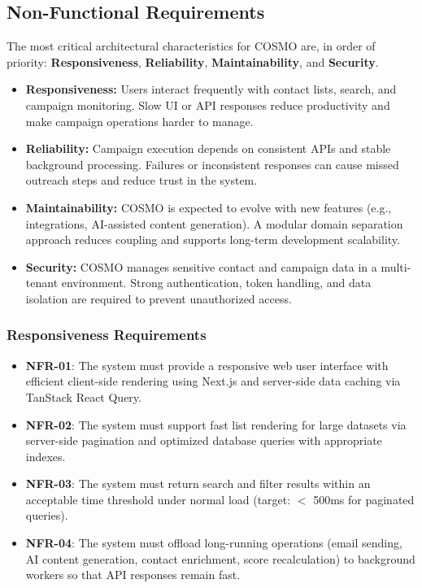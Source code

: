 
\subsection{Non-Functional Requirements}

The most critical architectural characteristics for COSMO are, in order of priority: \textbf{Responsiveness}, \textbf{Reliability}, \textbf{Maintainability}, and \textbf{Security}.

\begin{itemize}
    \item \textbf{Responsiveness:} Users interact frequently with contact lists, search, and campaign monitoring. Slow UI or API responses reduce productivity and make campaign operations harder to manage.
    \item \textbf{Reliability:} Campaign execution depends on consistent APIs and stable background processing. Failures or inconsistent responses can cause missed outreach steps and reduce trust in the system.
    \item \textbf{Maintainability:} COSMO is expected to evolve with new features (e.g., integrations, AI-assisted content generation). A modular domain separation approach reduces coupling and supports long-term development scalability.
    \item \textbf{Security:} COSMO manages sensitive contact and campaign data in a multi-tenant environment. Strong authentication, token handling, and data isolation are required to prevent unauthorized access.
\end{itemize}

\subsubsection{Responsiveness Requirements}
\begin{itemize}
    \item \textbf{NFR-01}: The system must provide a responsive web user interface with efficient client-side rendering using Next.js and server-side data caching via TanStack React Query.
    \item \textbf{NFR-02}: The system must support fast list rendering for large datasets via server-side pagination and optimized database queries with appropriate indexes.
    \item \textbf{NFR-03}: The system must return search and filter results within an acceptable time threshold under normal load (target: $<$ 500ms for paginated queries).
    \item \textbf{NFR-04}: The system must offload long-running operations (email sending, AI content generation, contact enrichment, score recalculation) to background workers so that API responses remain fast.
\end{itemize}

